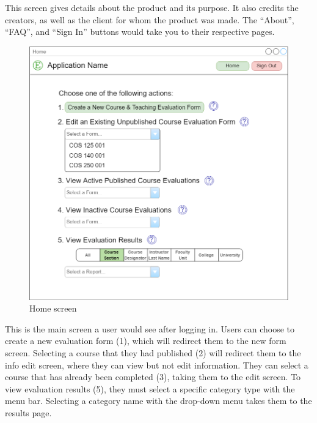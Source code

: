 \documentclass{article}
\begin{document}
This screen gives details about the product and its purpose. It also credits the creators, as well as the client for whom the product was made. The ``About'', ``FAQ'', and ``Sign In'' buttons would take you to their respective pages.

\newpage

\begin{center}
\begin{figure}[H]
    \centering
    \caption{Home screen}
    \includegraphics[width=6.5in]{images/home_screen.png}
\end{figure}
\end{center}

This is the main screen a user would see after logging in. Users can choose to create a new evaluation form (1), which will redirect them to the new form screen. Selecting a course that they had published (2) will redirect them to the info edit screen, where they can view but not edit information. They can select a course that has already been completed (3), taking them to the edit screen. To view evaluation results (5), they must select a specific category type with the menu bar. Selecting a category name with the drop-down menu takes them to the results page.

\newpage
\end{document}
